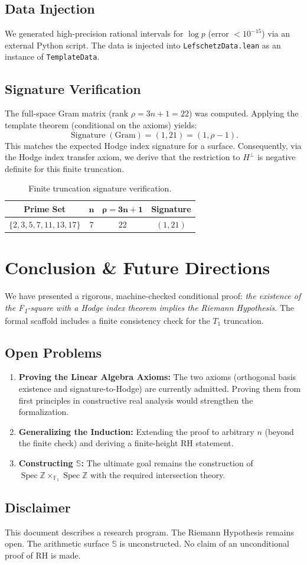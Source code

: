 \documentclass[11pt]{nyjm}
\theoremstyle{definition}
\begin{document}
\subsection{Data Injection}
We generated high-precision rational intervals for $\log p$ (error $< 10^{-15}$) via an external Python script. The data is injected into \texttt{LefschetzData.lean} as an instance of \texttt{TemplateData}.

\subsection{Signature Verification}
The full-space Gram matrix (rank $\rho = 3n+1 = 22$) was computed. Applying the template theorem (conditional on the axioms) yields:
\[
\operatorname{Signature}(\text{Gram}) = (1, 21) = (1, \rho - 1).
\]
This matches the expected Hodge index signature for a surface. Consequently, via the Hodge index transfer axiom, we derive that the restriction to $H^\perp$ is negative definite for this finite truncation.

\begin{table}[h]
\centering
\begin{tabular}{|c|c|c|c|}
\hline
\textbf{Prime Set} & $\mathbf{n}$ & $\mathbf{\rho = 3n+1}$ & \textbf{Signature} \\
\hline
$\{2,3,5,7,11,13,17\}$ & 7 & 22 & $(1, 21)$ \\
\hline
\end{tabular}
\caption{Finite truncation signature verification.}
\label{tab:signature}
\end{table}

\section{Conclusion \& Future Directions}
We have presented a rigorous, machine-checked conditional proof: \textit{the existence of the F\textsubscript{1}-square with a Hodge index theorem implies the Riemann Hypothesis}. The formal scaffold includes a finite consistency check for the $T_1$ truncation.

\subsection{Open Problems}
\begin{enumerate}
\item \textbf{Proving the Linear Algebra Axioms:} The two axioms (orthogonal basis existence and signature-to-Hodge) are currently admitted. Proving them from first principles in constructive real analysis would strengthen the formalization.
\item \textbf{Generalizing the Induction:} Extending the proof to arbitrary $n$ (beyond the finite check) and deriving a finite-height RH statement.
\item \textbf{Constructing $\mathbb{S}$:} The ultimate goal remains the construction of $\operatorname{Spec} \mathbb{Z} \times_{\mathbb{F}_1} \operatorname{Spec} \mathbb{Z}$ with the required intersection theory.
\end{enumerate}

\subsection*{Disclaimer}
This document describes a research program. The Riemann Hypothesis remains open. The arithmetic surface $\mathbb{S}$ is unconstructed. No claim of an unconditional proof of RH is made.
\end{document}
